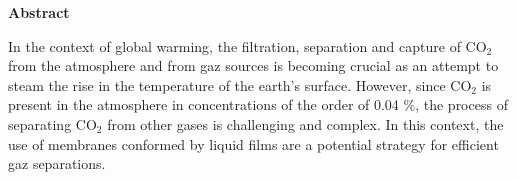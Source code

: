 \begin{center}
	\textbf{\Large{Abstract}}
\end{center}

\vspace{0.5cm}

\justifying

In the context of global warming, the filtration, separation and capture of CO$_2$ from the atmosphere and from gaz sources is becoming crucial as an attempt to steam the rise in the temperature of the earth's surface. However, since CO$_2$ is present in the atmosphere in concentrations of the order of 0.04 \%, the process of separating CO$_2$ from other gases is challenging and complex. In this context, the use of membranes conformed by liquid films are a potential strategy for efficient gaz separations. 

\vspace{3cm}

\clearpage